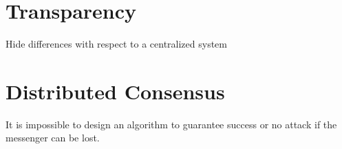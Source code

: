 \documentclass[11pt]{article}
\begin{document}
\section{Transparency} %
\label{sec:transparency}
Hide differences with respect to a centralized system


\section{Distributed Consensus} %
\label{sec:distributed_consensus}
It is impossible to design an algorithm to guarantee success or no attack if the messenger can be lost.
\end{document}
